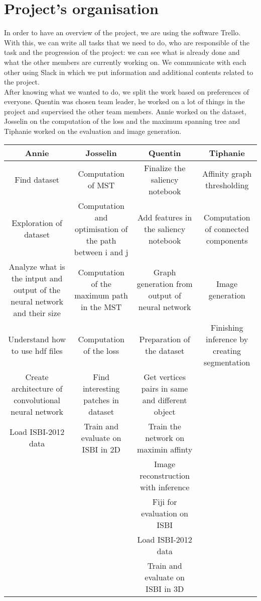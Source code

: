 \documentclass{article}
\begin{document}
\section{Project’s organisation}

In order to have an overview of the project, we are using the software Trello. With this, we can write all tasks that we need to do, who are responsible of the task and the progression of the project: we can see what is already done and what the other members are currently working on. We communicate with each other using Slack in which we put information and additional contents related to the project. \\

After knowing what we wanted to do, we split the work based on preferences of everyone. Quentin was chosen team leader, he worked on a lot of things in the project and supervised the other team members. Annie worked on the dataset, Josselin on the computation of the loss and the maximum spanning tree and Tiphanie worked on the evaluation and image generation. \\

\begin{center}
\begin{tabular}{ |c|c|c|c| } 
 \hline
 Annie & Josselin & Quentin & Tiphanie \\
 \hline
 Find dataset & Computation of MST & Finalize the saliency notebook & Affinity graph thresholding \\ 
 \hline
 Exploration of dataset & Computation and optimisation of the path between i and j & Add features in the saliency notebook & Computation of connected components \\ 
 \hline
 Analyze what is the intput and output of the neural network and their size & Computation of the maximum path in the MST & Graph generation from output of neural network & Image generation \\ 
 \hline
 Understand how to use hdf files & Computation of the loss & Preparation of the dataset & Finishing inference by creating segmentation \\
 \hline
 Create architecture of convolutional neural network & Find interesting patches in dataset & Get vertices pairs in same and different object & \\
 \hline
 Load ISBI-2012 data & Train and evaluate on ISBI in 2D & Train the network on maximin affinty & \\
 \hline
  & & Image reconstruction with inference & \\
 \hline
  & & Fiji for evaluation on ISBI & \\
 \hline
  & & Load ISBI-2012 data & \\
 \hline
 & & Train and evaluate on ISBI in 3D & \\

 \hline
\end{tabular}
\end{center}
\end{document}
